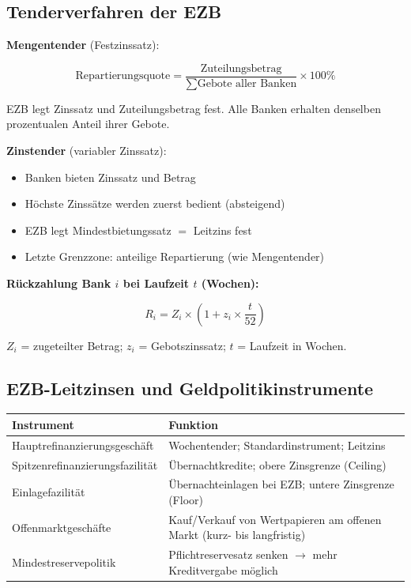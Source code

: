 \documentclass[10pt,a4paper]{article}
\begin{document}
\begin{multicols}{2}
\columnbreak

\subsection{Tenderverfahren der EZB}

\textbf{Mengentender} (Festzinssatz):
\begin{vwlbox}
\[
\text{Repartierungsquote} = \frac{\text{Zuteilungsbetrag}}{\sum \text{Gebote aller Banken}} \times 100\%
\]
\end{vwlbox}
EZB legt Zinssatz und Zuteilungsbetrag fest. Alle Banken erhalten denselben prozentualen Anteil ihrer Gebote.

\vspace{4pt}
\textbf{Zinstender} (variabler Zinssatz):
\begin{itemize}[noitemsep, leftmargin=*]
  \item Banken bieten Zinssatz und Betrag
  \item Höchste Zinssätze werden zuerst bedient (absteigend)
  \item EZB legt Mindestbietungssatz $=$ Leitzins fest
  \item Letzte Grenzzone: anteilige Repartierung (wie Mengentender)
\end{itemize}

\textbf{Rückzahlung Bank $i$ bei Laufzeit $t$ (Wochen):}
\begin{vwlbox}
\[
R_i = Z_i \times \left(1 + z_i \times \frac{t}{52}\right) %
\]
\end{vwlbox}
{\footnotesize $Z_i$ = zugeteilter Betrag; $z_i$ = Gebotszinssatz; $t$ = Laufzeit in Wochen.}

\subsection{EZB-Leitzinsen und Geldpolitikinstrumente}

\begin{tabular}{|L{3.5cm}|L{4cm}|}
\hline
{}
\textbf{Instrument} & \textbf{Funktion} \\
\hline
Haupt\-refi\-nan\-zie\-rungs\-geschäft & Wochentender; Standardinstrument; Leitzins \\
\hline
Spitzen\-refi\-nan\-zie\-rungs\-fazilität & Übernachtkredite; obere Zinsgrenze (Ceiling) \\
\hline
Einlagefazilität & Übernachteinlagen bei EZB; untere Zinsgrenze (Floor) \\
\hline
Offenmarktgeschäfte & Kauf/Verkauf von Wertpapieren am offenen Markt (kurz- bis langfristig) \\
\hline
Mindestreservepolitik & Pflichtreservesatz senken $\to$ mehr Kreditvergabe möglich \\
\hline
\end{tabular}


\end{multicols}
\end{document}
